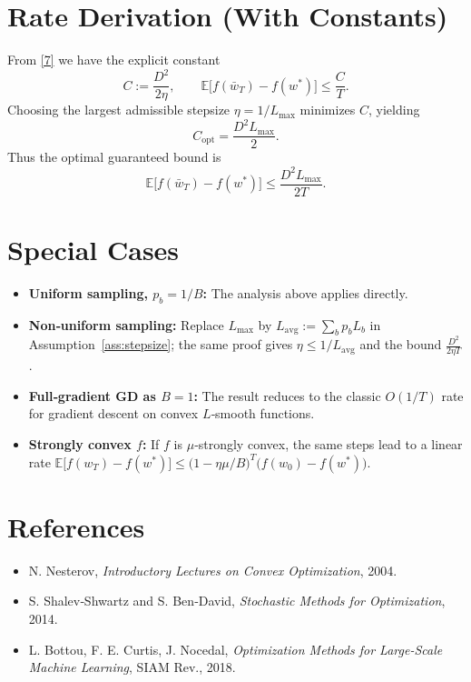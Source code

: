 \documentclass[11pt]{article}
\newcommand{\E}{\mathbb{E}}
\begin{document}
\section*{Rate Derivation (With Constants)}
From \eqref{7} we have the explicit constant
\[
C:=\frac{D^{2}}{2\eta},
\qquad
\E\!\bigl[f(\bar w_T)-f(w^{*})\bigr]\le\frac{C}{T}.
\]
Choosing the largest admissible stepsize $\eta=1/L_{\max}$ minimizes $C$,
yielding
\[
C_{\text{opt}}=\frac{D^{2}L_{\max}}{2}.
\]
Thus the optimal guaranteed bound is
\[
\E\!\bigl[f(\bar w_T)-f(w^{*})\bigr]\le
\frac{D^{2}L_{\max}}{2T}.
\]

\section*{Special Cases}
\begin{itemize}
\item \textbf{Uniform sampling, $p_b=1/B$:} The analysis above applies directly.
\item \textbf{Non‑uniform sampling:} Replace $L_{\max}$ by
$L_{\text{avg}}:=\sum_{b}p_bL_b$ in Assumption~\ref{ass:stepsize};
the same proof gives $\eta\le1/L_{\text{avg}}$ and the bound
$\frac{D^{2}}{2\eta T}$.
\item \textbf{Full‑gradient GD as $B=1$:} The result reduces to the classic
$O(1/T)$ rate for gradient descent on convex $L$‑smooth functions.
\item \textbf{Strongly convex $f$:} If $f$ is $\mu$‑strongly convex,
the same steps lead to a linear rate
$\E\!\bigl[f(w_T)-f(w^{*})\bigr]\le
\bigl(1-\eta\mu/B\bigr)^{T}\bigl(f(w_0)-f(w^{*})\bigr)$.
\end{itemize}

\section*{References}
\begin{itemize}
\item N. Nesterov, \emph{Introductory Lectures on Convex Optimization}, 2004.
\item S. Shalev‑Shwartz and S. Ben‑David, \emph{Stochastic Methods for
Optimization}, 2014.
\item L. Bottou, F. E. Curtis, J. Nocedal, \emph{Optimization Methods for
Large‑Scale Machine Learning}, SIAM Rev., 2018.
\end{itemize}
\end{document}
